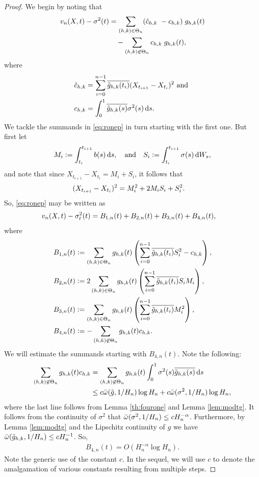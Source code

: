 \begin{proof} We begin by noting that 
\begin{align}
  v_n(X, t) - \sigma^2(t) & = \sum_{(h,k) \in \Theta_n} (\hat{c}_{h,k}\ - {c}_{h,k})\;g_{h,k}(t)\notag\\
  & \quad -\sum_{(h,k) \not\in \Theta_n} {c}_{h,k}\;g_{h,k}(t),\label{eq:ronep} 
\end{align}
  where 
\begin{align}  
  \cnhk &= \sum_{i =0}^{n-1} \btghki (X_{t_{i+1}} - X_{t_i})^2 \text{ and }\notag\\  
  \chk &= \int^1_0 \btghks \sigma^2(s) \D s. \notag
\end{align}
We tackle the summands in \eqref{eq:ronep} in turn starting with the first one. But first let 
\begin{align}
  M_i := \int_{t_i}^{t_{i+1}} b(s) \D s, \quad \text{and} \quad  S_i := \int_{t_i}^{t_{i+1}} \sigma(s) \D W_s, \notag
\end{align}
and note that since $X_{t_{i+1}} - X_{t_i} = M_i + S_i$, it follows that
\begin{align}
  (X_{t_{i+1}} - X_{t_i})^2 &= M_i^2  
  + 2M_iS_i +   S_i^2.\notag 
\end{align}
So, \eqref{eq:ronep} may be written as 
\begin{align}
  &v_n(X, t) - \sigma_t^2(t) = B_{1,n}(t) + B_{2,n}(t) + B_{3,n}(t) + B_{4,n}(t), \notag
\end{align}
where
\begin{align}
  &B_{1,n}(t) :=  \sum_{(h,k) \in \Theta_n} g_{h,k}(t) \left(\sum_{i=0}^{n-1} \overline{\tilde{g}_{h,k}(t_i)} S_i^2  - {c}_{h,k}\right), \notag\\
  &B_{2,n}(t) := 2 \sum_{(h,k) \in \Theta_n} g_{h,k}(t)\left(\sum_{i=0}^{n-1} \overline{\tilde{g}_{h,k}(t_i)} S_i M_i \right), \notag\\
  &B_{3,n}(t) := \sum_{(h,k) \in \Theta_n} g_{h,k}(t)\left( \sum_{i=0}^{n-1} \overline{\tilde{g}_{h,k}(t_i)} M_i^2 \right), \notag\\
  &B_{4,n}(t) := - \sum_{\substack{(h,k) \not\in \Theta_n }}g_{h,k}(t){c}_{h,k}. 
  \label{}
\end{align}
We will estimate the summands starting with $B_{4,n}(t)$. Note the following:
\begin{align}
  \sum_{\substack{(h,k) \not\in \Theta_n }}g_{h,k}(t)\chk &=  \sum_{\substack{(h,k) \not\in \Theta_n }}g_{h,k}(t)\int^1_0\sigma^2 (s) { \btghks} \D s \notag\\ 
&\le c\modc{\tg}{1/H_n}\log H_n  + c\modc{\sigma^2}{1/H_n} \log H_n\notag,
\end{align}
where the last  line follows from Lemma \ref{th:fourone} and Lemma \ref{lem:modtg}. It follows from the \holder continuity of $\sigma^2$ that   ${\bar{\omega}}({\sigma^2},1/H_n) \le c H_n^{-\alpha}$. Furthermore, by Lemma \ref{lem:modtg} and the Lipschitz continuity of $g$ we have ${\bar{\omega}}({\tilde{g}_{h,k}},1/H_n) \le c H^{-1}_n$.  So,  
\begin{align}
 B_{4,n}(t) =  O( H_n^{-\alpha}\log H_n).
  \label{eq:B4}
\end{align}
Note the generic use of the constant  $c$. In the sequel, we will use $c$ to denote the amalgamation of various constants resulting from multiple steps. 


\end{proof}
